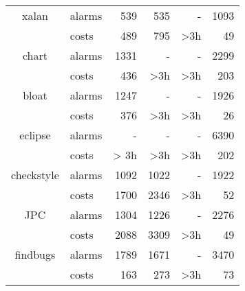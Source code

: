 \begin{table}[]
\begin{tabular}{@{}clrrrr@{}}
		xalan      & alarms & 539                      & 535                         & -                               & 1093                          \\
		& costs  & 489                     & 795                         & >3h               & 49                            \\\midrule
		chart      & alarms & 1331                     &  -                           & -                               & 2299                              \\
		& costs  & 436                      & >3h            & >3h               & 203                              \\\midrule
		bloat      & alarms & 1247                     & -                            & -                               & 1926                          \\
		& costs  & 376                      & >3h            & >3h               & 26                            \\\midrule
		eclipse    & alarms &  -                        &  -                           & -                               & 6390                          \\
		& costs  & > 3h                         & >3h            & >3h               & 202                           \\\midrule
		checkstyle & alarms &  1092                        & 1022                        & -                               & 1922                              \\
		& costs  & 1700                         & 2346                        & >3h               &  52                             \\\midrule
		JPC        & alarms & 1304                         & 1226                        &  -                              &   2276                            \\
		& costs  & 2088                        & 3309                        & >3h               &  49                             \\\midrule
		findbugs   & alarms & 1789                         & 1671                        &  -                              &  3470                             \\
		& costs  &  163                        & 273                         & >3h               &   73                            \\ \bottomrule
	\end{tabular}
\end{table}


